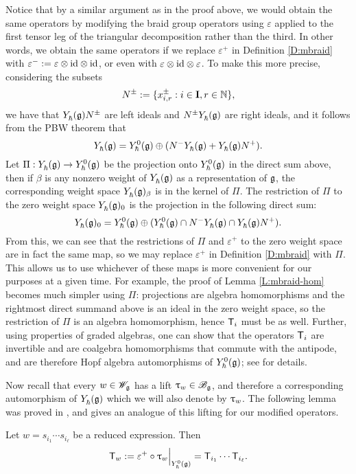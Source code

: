 Notice that by a similar argument as in the proof above, we would obtain the same operators by modifying the braid group operators using $\varepsilon$ applied to the first tensor leg of the triangular decomposition rather than the third.
In other words, we obtain the same operators if we replace $\varepsilon^+$ in Definition \ref{D:mbraid} with $\varepsilon^- := \varepsilon\otimes{\id}\otimes{\id}$, or even with $\varepsilon\otimes{\id}\otimes\varepsilon$.
To make this more precise, considering the subsets
\[N^\pm := \{x^\pm_{i,r} : i\in\I, r\in\N\},\]
we have that $\Yhg N^\pm$ are left ideals and $N^\pm \Yhg$ are right ideals, and it follows from the PBW theorem that
\[\Yhg = \Yhg[0] \oplus (N^-\Yhg + \Yhg N^+).\]
Let $\Pi:\Yhg\to\Yhg[0]$ be the projection onto $\Yhg[0]$ in the direct sum above, then if $\beta$ is any nonzero weight of $\Yhg$ as a representation of $\g$, the corresponding weight space $\Yhg_\beta$ is in the kernel of $\Pi$.
The restriction of $\Pi$ to the zero weight space $\Yhg_0$ is the projection in the following direct sum:
\[\Yhg_0 = \Yhg[0] \oplus (\Yhg[0] \cap N^-\Yhg \cap \Yhg N^+).\]
From this, we can see that the restrictions of $\Pi$ and $\varepsilon^+$ to the zero weight space are in fact the same map, so we may replace $\varepsilon^+$ in Definition \ref{D:mbraid} with $\Pi$.
This allows us to use whichever of these maps is more convenient for our purposes at a given time.
For example, the proof of Lemma \ref{L:mbraid-hom} becomes much simpler using $\Pi$: projections are algebra homomorphisms and the rightmost direct summand above is an ideal in the zero weight space, so the restriction of $\Pi$ is an algebra homomorphism, hence $\mbraid_i$ must be as well.
Further, using properties of graded algebras, one can show that the operators $\mbraid_i$ are invertible and are coalgebra homomorphisms that commute with the antipode, and are therefore Hopf algebra automorphisms of $\Yhg[0]$; see \cite[Lemma 3.5]{friesen_braid_2024} for details.

Now recall that every $w\in\Wg$ has a lift $\braid_w\in\Bg$, and therefore a corresponding automorphism of $\Yhg$ which we will also denote by $\braid_w$.
The following lemma was proved in \cite[Thm. 5.3.19]{weekes_highest_2016}, and gives an analogue of this lifting for our modified operators.

\begin{lemma}\label{L:Tw}
    Let $w=s_{i_1}\cdots s_{i_\ell}$ be a reduced expression. Then
    \[\mbraid_w := \varepsilon^+\circ\braid_w\Big|_{\Yhg[0]} = \mbraid_{i_1}\cdots\mbraid_{i_\ell}.\]
\end{lemma}

